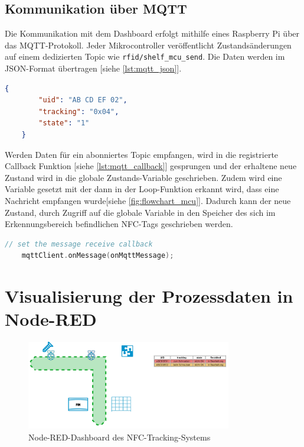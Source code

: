 \newpage

\subsection*{Kommunikation über MQTT}

Die Kommunikation mit dem Dashboard erfolgt mithilfe eines Raspberry Pi über das MQTT-Protokoll. Jeder Mikrocontroller veröffentlicht Zustandsänderungen auf einem dedizierten Topic wie \texttt{rfid/shelf\_mcu\_send}. Die Daten werden im JSON-Format übertragen [siehe \autoref{lst:mqtt_json}].

\begin{lstlisting}[language=json, caption={Beispiel einer MQTT JSON Nachricht von der Werkerassistenzstation (0x04: zur Schraubstation, 1: iO) (siehe \autoref{tab:tracking_states})}, label={lst:mqtt_json}]
	{
		"uid": "AB CD EF 02",
		"tracking": "0x04",
		"state": "1"
	}
\end{lstlisting}

Werden Daten für ein abonniertes Topic empfangen, wird in die registrierte Callback Funktion [siehe \autoref{lst:mqtt_callback}] gesprungen und der erhaltene neue Zustand wird in die globale Zustands-Variable geschrieben. Zudem wird eine Variable gesetzt mit der dann in der Loop-Funktion erkannt wird, dass eine Nachricht empfangen wurde[siehe \autoref{fig:flowchart_mcu}]. Dadurch kann der neue Zustand, durch Zugriff auf die globale Variable in den Speicher des sich im Erkennungsbereich befindlichen NFC-Tags geschrieben werden. 

\begin{lstlisting}[language=C, caption={Registrierung des Callbacks in der Setup-Funktion}, label={lst:mqtt_callback}]
	// set the message receive callback
	mqttClient.onMessage(onMqttMessage);
\end{lstlisting}

\section{Visualisierung der Prozessdaten in Node-RED}
\label{sec:Node-Red}

\begin{figure}[H]
	\centering
	\includegraphics[width=0.8\textwidth]{images/node-red-band.jpeg}
	\caption{Node-RED-Dashboard des NFC-Tracking-Systems}
	\label{fig:dashboard}
\end{figure}

